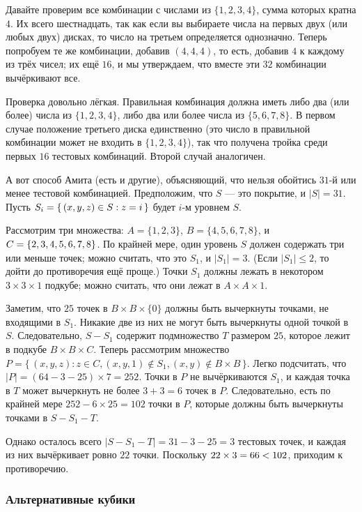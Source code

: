 Давайте проверим все комбинации с числами из $\{1, 2, 3, 4\}$, сумма которых кратна $4$.
Их всего шестнадцать, так как если вы выбираете числа на первых двух (или любых двух) дисках, то число на третьем определяется однозначно.
Теперь попробуем те же комбинации, добавив $(4,4,4)$, то есть, добавив $4$ к каждому из трёх чисел;
их ещё $16$, и мы утверждаем, что вместе эти $32$ комбинации вычёркивают все.

Проверка довольно лёгкая.
Правильная комбинация должна иметь либо два (или более) числа из $\{1, 2, 3, 4\}$, либо два или более числа из  $\{5, 6, 7, 8\}$.
В первом случае положение третьего диска единственно (это число в правильной комбинации может не входить в $\{1, 2, 3, 4\}$), так что получена тройка среди первых $16$ тестовых комбинаций.
Второй случай аналогичен.

А вот способ Амита (есть и другие), объясняющий, что нельзя обойтись $31$-й или менее тестовой комбинацией.
Предположим, что $S$ --- это покрытие, и $|S| = 31$.
Пусть $S_i = \{\,(x, y, z) \z\in S : z = i\,\}$ будет $i$-м уровнем $S$.

Рассмотрим три множества:
$A=\{1, 2, 3\}$,
$B = \{4, 5, 6, 7, 8\}$,
и $C \z= \{2, 3, 4, 5, 6, 7, 8\}$.
По крайней мере, один уровень $S$ должен содержать три или меньше точек;
можно считать, что это $S_1$, и $|S_1| = 3$.
(Если $|S_1| \le 2$, то дойти до противоречия ещё проще.)
Точки $S_1$ должны лежать в некотором $3 \times 3 \times 1$ подкубе;
можно считать, что они лежат в $A \times A \times {1}$.

Заметим, что $25$ точек в $B \times B \times \{0\}$ должны быть вычеркнуты точками, не входящими в $S_1$.
Никакие две из них не могут быть вычеркнуты одной точкой в $S$.
Следовательно, $S - S_1$ содержит подмножество $T$ размером $25$, которое лежит в подкубе $B \times B \times C$.
Теперь рассмотрим множество $P = \{\,(x, y, z) : z \in C, (x, y, 1) \notin S_1 , (x, y) \notin B \times B\,\}$.
Легко подсчитать, что $|P| = (64-3-25) \times 7 = 252$.
Точки в $P$ не вычёркиваются $S_1$, и каждая точка в $T$ может вычеркнуть не более $3 + 3 = 6$ точек в $P$. Следовательно, есть по крайней мере $252 - 6 \times 25 = 102$ точки в $P$, которые должны быть вычеркнуты точками в $S - S_1 - T$.

Однако осталось всего $|S - S_1 - T | = 31 - 3 - 25 = 3$ тестовых точек, и каждая из них вычёркивает ровно $22$ точки.
Поскольку $22 \times 3 = 66 \z< 102$, приходим к противоречию. 

\subsubsection*{Альтернативные кубики}

